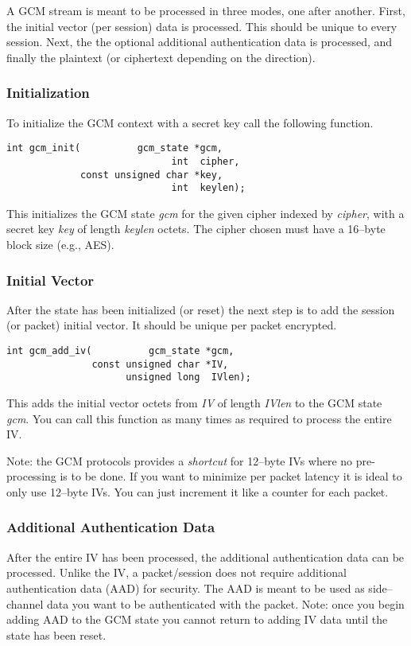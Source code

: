 \documentclass[synpaper]{book}
\begin{document}
A GCM stream is meant to be processed in three modes, one after another.  First, the initial vector (per session) data is processed.  This should be
unique to every session.  Next, the the optional additional authentication data is processed, and finally the plaintext (or ciphertext depending on the direction).

\subsubsection{Initialization}
To initialize the GCM context with a secret key call the following function.

\begin{verbatim}
int gcm_init(          gcm_state *gcm,
                             int  cipher,
             const unsigned char *key,
                             int  keylen);
\end{verbatim}
This initializes the GCM state \textit{gcm} for the given cipher indexed by \textit{cipher}, with a secret key \textit{key} of length \textit{keylen} octets.  The cipher
chosen must have a 16--byte block size (e.g., AES).

\subsubsection{Initial Vector}
After the state has been initialized (or reset) the next step is to add the session (or packet) initial vector.  It should be unique per packet encrypted.

\begin{verbatim}
int gcm_add_iv(          gcm_state *gcm,
               const unsigned char *IV,
                     unsigned long  IVlen);
\end{verbatim}
This adds the initial vector octets from \textit{IV} of length \textit{IVlen} to the GCM state \textit{gcm}.  You can call this function as many times as required
to process the entire IV.

Note: the GCM protocols provides a \textit{shortcut} for 12--byte IVs where no pre-processing is to be done.  If you want to minimize per packet latency it is ideal
to only use 12--byte IVs.  You can just increment it like a counter for each packet.

\subsubsection{Additional Authentication Data}
After the entire IV has been processed, the additional authentication data can be processed.  Unlike the IV, a packet/session does not require additional
authentication data (AAD) for security.  The AAD is meant to be used as side--channel data you want to be authenticated with the packet.  Note:  once
you begin adding AAD to the GCM state you cannot return to adding IV data until the state has been reset.
\end{document}
